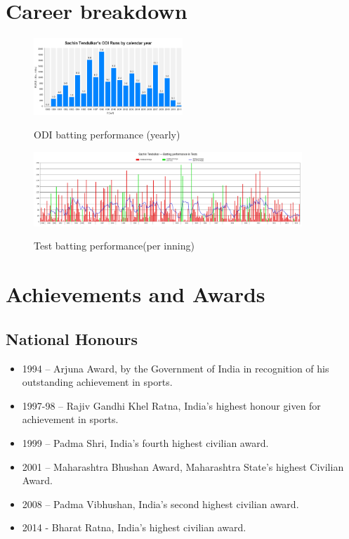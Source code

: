 \documentclass{article}
\begin{document}
\section{Career breakdown}
\begin{figure}[h!]
\begin{center}
\includegraphics[width=0.5\textwidth]{odi.jpg}
\label{fig:odi}
\caption{ODI batting performance (yearly) }
\end{center}
\end{figure}


\begin{figure}[h!]
\begin{center}
\includegraphics[width=0.9\textwidth]{test.png}
\label{fig:test}
\caption{Test batting performance(per inning)} 
\end{center}
\end{figure}



\section{Achievements and Awards}
\subsection{National Honours \cite{wiki}}
\begin{itemize}
\item 1994 – Arjuna Award, by the Government of India in recognition of his outstanding achievement in sports.
\item 1997-98 – Rajiv Gandhi Khel Ratna, India's highest honour given for achievement in sports.
\item 1999 – Padma Shri, India's fourth highest civilian award.
\item 2001 – Maharashtra Bhushan Award, Maharashtra State's highest Civilian Award.
\item 2008 – Padma Vibhushan, India's second highest civilian award.
\item 2014 - Bharat Ratna, India's highest civilian award.
\end{itemize}
\end{document}
